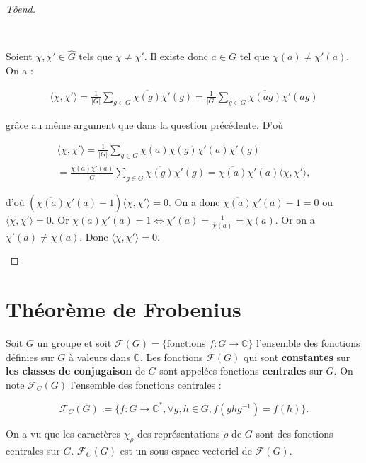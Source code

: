 \documentclass[french]{book}
\theoremstyle{definition}
\begin{document}
\begin{proof}[T\~{o}end]
\begin{enumerate}
    \

    Soient \(\chi, \chi' \in \hat{G}\) tels que \(\chi \neq \chi'\). Il existe donc \(a \in G\) tel que \(\chi(a) \neq \chi'(a)\). On a :

    \begin{gather*}
      \langle \chi, \chi' \rangle  = \frac{1}{\lvert G \rvert} \sum_{g \in G}^{} \overline{\chi(g)} \chi'(g) = \frac{1}{\lvert G \rvert} \sum_{g \in G} \overline{\chi(ag)} \chi'(ag)
    \end{gather*}

    grâce au même argument que dans la question précédente. D'où

    \begin{gather*}
      \langle \chi, \chi' \rangle = \frac{1}{\lvert G \rvert} \sum_{g \in G} \chi(a)\chi(g) \chi'(a)\chi'(g) \\
       = \frac{\overline{\chi(a)} \chi'(a)}{\lvert G \rvert} \sum_{g \in G}^{} \overline{\chi(g)} \chi'(g)  = \overline{\chi(a)} \chi'(a) \langle \chi, \chi' \rangle,
    \end{gather*}

    d'où \((\overline{\chi(a)} \chi'(a) - 1) \langle \chi, \chi' \rangle = 0\). On a donc \(\overline{\chi(a)} \chi'(a) - 1 = 0\) ou \(\langle \chi, \chi' \rangle = 0\). Or \(\overline{\chi(a)}\chi'(a) = 1 \iff \chi'(a) = \frac{1}{\overline{\chi}(a)} = \chi(a)\). Or on a \(\chi'(a) \neq \chi(a)\). Donc \(\langle \chi, \chi' \rangle = 0\).
  \end{enumerate}
\end{proof}

\section{Théorème de Frobenius}

Soit \(G\) un groupe et soit \(\mathscr{F}(G) = \{ \text{fonctions } f : G \longrightarrow \mathbb{C} \} \) l'ensemble des fonctions définies sur \(G\) à valeurs dans \(\mathbb{C}\). Les fonctions \(\mathscr{F}(G)\) qui sont \textbf{constantes} sur  \textbf{les classes de conjugaison} de \(G\) sont appelées fonctions \textbf{centrales} sur \(G\). On note \(\mathscr{F}_C(G)\) l'ensemble des fonctions centrales :

\[\mathscr{F}_C(G) := \{ f : G \longrightarrow \mathbb{C} ^{*}, \forall g, h \in G, f (ghg ^{-1}) = f(h)\}.\]

On a vu que les caractères \(\chi _{\rho}\) des représentations \(\rho\) de \(G\) sont des fonctions centrales sur \(G\). \(\mathscr{F}_C(G)\) est un sous-espace vectoriel de \(\mathscr{F}(G)\).
\end{document}
